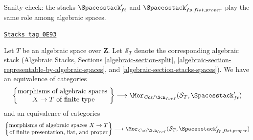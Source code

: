 Sanity check: the stacks $\Spacesstack'_{ft}$ and
$\Spacesstack'_{fp, flat, proper}$
play the same role among algebraic spaces.

\begin{lemma}
\label{quot-lemma-extend-spaces-to-spaces}
\href{https://stacks.math.columbia.edu/tag/0E93}{\texttt{Stacks tag 0E93}}

Let $T$ be an algebraic space over $\mathbf{Z}$. Let $\mathcal{S}_T$
denote the corresponding algebraic stack (Algebraic Stacks, Sections
\ref{algebraic-section-split},
\ref{algebraic-section-representable-by-algebraic-spaces}, and
\ref{algebraic-section-stacks-spaces}).
We have an equivalence of categories
$$
\left\{
\begin{matrix}
\text{morphisms of algebraic spaces }\\
X \to T\text{ of finite type}
\end{matrix}
\right\}
\longrightarrow
\Mor_{\textit{Cat}/\Sch_{fppf}}(\mathcal{S}_T, \Spacesstack'_{ft})
$$
and an equivalence of categories
$$
\left\{
\begin{matrix}
\text{morphisms of algebraic spaces }X \to T\\
\text{of finite presentation, flat, and proper}
\end{matrix}
\right\}
\longrightarrow
\Mor_{\textit{Cat}/\Sch_{fppf}}(\mathcal{S}_T,
\Spacesstack'_{fp, flat, proper})
$$
\end{lemma}

